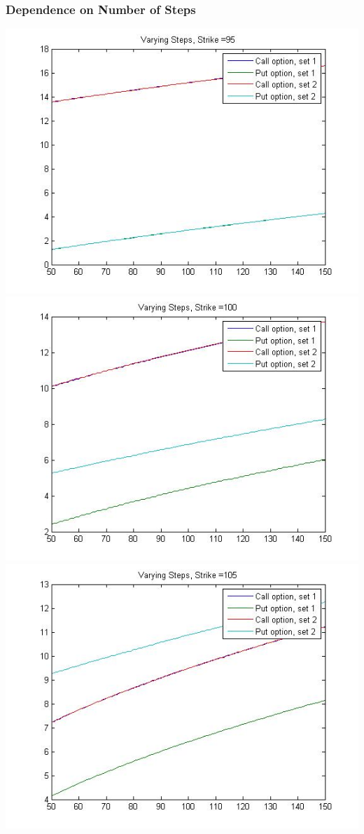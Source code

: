 \documentclass[12pt]{article}
\begin{document}
    \subsubsection*{Dependence on Number of Steps}
    \begin{center}
      \includegraphics[width=6in]{steps95.jpg}
      \includegraphics[width=6in]{steps100.jpg}
      \includegraphics[width=6in]{steps105.jpg}
    \end{center}
\end{document}
